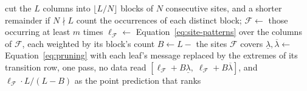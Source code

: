\documentclass[11pt,a4paper]{article}
\begin{document}
\begin{algorithm}[htbp]
\caption{The block-frequency bracket, Equation~\ref{eq:block-frequency-bound}}
\label{alg:block-frequency}
\begin{algorithmic}[1]
\State cut the $L$ columns into $\lfloor L/N \rfloor$ blocks of $N$ consecutive
       sites, and a shorter remainder if $N \nmid L$
\State count the occurrences of each distinct block;
       $\mathcal{F} \gets$ those occurring at least $m$ times
\State $\ell_{\mathcal{F}} \gets$ Equation~\ref{eq:site-patterns} over the
       columns of $\mathcal{F}$, each weighted by its block's count
\State $B \gets L - $ the sites $\mathcal{F}$ covers
\State $\underline\lambda, \overline\lambda \gets$
       Equation~\ref{eq:pruning} with each leaf's message replaced by the
       extremes of its transition row, one pass, no data read
\State \Return
       $[\ell_{\mathcal{F}} + B \underline\lambda,\;
         \ell_{\mathcal{F}} + B \overline\lambda]$, and
       $\ell_{\mathcal{F}} \cdot L / (L - B)$ as the point prediction that
       ranks
\end{algorithmic}
\end{algorithm}
\end{document}
